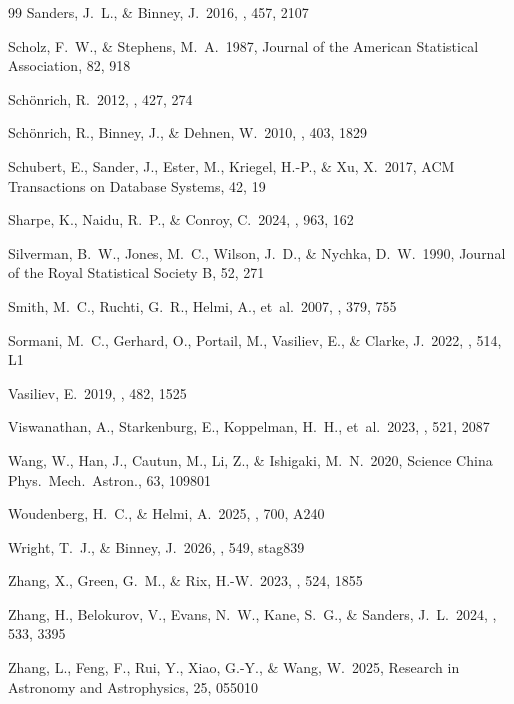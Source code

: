 \documentclass{aa}  %
\begin{document}
\begin{thebibliography}{99}
Sanders, J.~L., \& Binney, J.\ 2016, \mnras, 457, 2107

Scholz, F.~W., \& Stephens, M.~A.\ 1987, Journal of the American
Statistical Association, 82, 918

Sch\"onrich, R.\ 2012, \mnras, 427, 274

Sch\"onrich, R., Binney, J., \& Dehnen, W.\ 2010, \mnras, 403, 1829

Schubert, E., Sander, J., Ester, M., Kriegel, H.-P., \& Xu, X.\ 2017,
ACM Transactions on Database Systems, 42, 19

Sharpe, K., Naidu, R.~P., \& Conroy, C.\ 2024, \apj, 963, 162

Silverman, B.~W., Jones, M.~C., Wilson, J.~D., \& Nychka, D.~W.\ 1990,
Journal of the Royal Statistical Society B, 52, 271

Smith, M.~C., Ruchti, G.~R., Helmi, A., et~al.\ 2007, \mnras,
379, 755

Sormani, M.~C., Gerhard, O., Portail, M., Vasiliev, E., \& Clarke,
J.\ 2022, \mnras, 514, L1

Vasiliev, E.\ 2019, \mnras, 482, 1525

Viswanathan, A., Starkenburg, E., Koppelman, H.~H., et~al.\ 2023,
\mnras, 521, 2087

Wang, W., Han, J., Cautun, M., Li, Z., \& Ishigaki, M.~N.\ 2020,
Science China Phys.\ Mech.\ Astron., 63, 109801

Woudenberg, H.~C., \& Helmi, A.\ 2025, \aap, 700, A240

Wright, T.~J., \& Binney, J.\ 2026, \mnras, 549, stag839

Zhang, X., Green, G.~M., \& Rix, H.-W.\ 2023, \mnras, 524, 1855

Zhang, H., Belokurov, V., Evans, N.~W., Kane, S.~G., \& Sanders, J.~L.\
2024, \mnras, 533, 3395

Zhang, L., Feng, F., Rui, Y., Xiao, G.-Y., \& Wang, W.\ 2025,
Research in Astronomy and Astrophysics, 25, 055010

\end{thebibliography}
\end{document}
